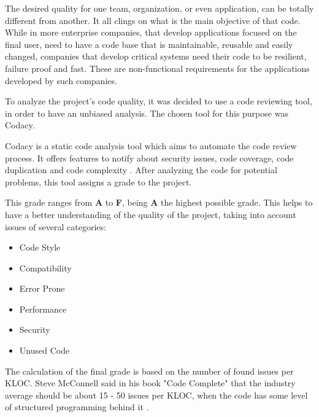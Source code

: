 \par

The desired quality for one team, organization, or even application, can be totally different from another. It all clings on what is the main objective of that code. While in more enterprise companies, that develop applications focused on the final user, need to have a code base that is maintainable, reusable and easily changed, companies that develop critical systems need their code to be resilient, failure proof and fast. These are non-functional requirements for the applications developed by such companies.

\par

To analyze the project's code quality, it was decided to use a code reviewing tool, in order to have an unbiased analysis. The chosen tool for this purpose was Codacy.

\par

Codacy is a static code analysis tool which aims to automate the code review process. It offers features to notify about security issues, code coverage, code duplication and code complexity \parencite{codacy}. After analyzing the code for potential problems, this tool assigns a grade to the project. 

\par

This grade ranges from \textbf{A} to \textbf{F}, being \textbf{A} the highest possible grade. This helps to have a better understanding of the quality of the project, taking into account issues of several categories:
\begin{itemize}
  \item Code Style
  \item Compatibility
  \item Error Prone
  \item Performance
  \item Security
  \item Unused Code
\end{itemize}

The calculation of the final grade is based on the number of found issues per \gls{KLOC}. Steve McConnell said in his book "Code Complete" that the industry average should be about 15 - 50 issues per \gls{KLOC}, when the code has some level of structured programming behind it \parencite{codeComplete}.

\par


